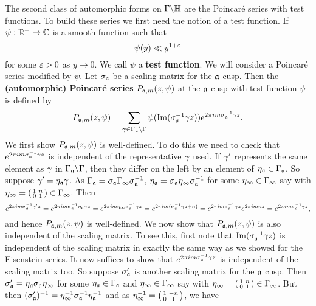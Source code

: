       The second class of automorphic forms on $\Gamma\backslash\mathbb{H}$ are the Poincar\'e series with test functions. To build these series we first need the notion of a test function. If $\psi:\mathbb{R}^{+} \to \mathbb{C}$ is a smooth function such that
      \[
        \psi(y) \ll y^{1+\varepsilon}
      \]
      for some $\varepsilon > 0$ as $y \to 0$. We call $\psi$ a \textbf{test function}. We will consider a Poincar\'e series modified by $\psi$. Let $\sigma_{\mathfrak{a}}$ be a scaling matrix for the $\mathfrak{a}$ cusp. Then the \textbf{(automorphic) Poincar\'e series} $P_{\mathfrak{a},m}(z,\psi)$ at the $\mathfrak{a}$ cusp with test function $\psi$ is defined by
      \[
        P_{\mathfrak{a},m}(z,\psi) = \sum_{\gamma \in \Gamma_{\mathfrak{a}}\backslash\Gamma}\psi(\mathrm{Im}(\sigma_{\mathfrak{a}}^{-1}\gamma z))e^{2\pi im\sigma_{\mathfrak{a}}^{-1}\gamma z}.
      \]
      We first show $P_{\mathfrak{a},m}(z,\psi)$ is well-defined. To do this we need to check that $e^{2\pi im\sigma_{\mathfrak{a}}^{-1}\gamma z}$ is independent of the representative $\gamma$ used. If $\gamma'$ represents the same element as $\gamma$ in $\Gamma_{\mathfrak{a}}\backslash\Gamma$, then they differ on the left by an element of $\eta_{\mathfrak{a}} \in \Gamma_{\mathfrak{a}}$. So suppose $\gamma' = \eta_{\mathfrak{a}}\gamma$. As $\Gamma_{\mathfrak{a}} = \sigma_{\mathfrak{a}}\Gamma_{\infty}\sigma_{\mathfrak{a}}^{-1}$, $\eta_{\mathfrak{a}} = \sigma_{\mathfrak{a}}\eta_{\infty}\sigma_{\mathfrak{a}}^{-1}$ for some $\eta_{\infty} \in \Gamma_{\infty}$ say with $\eta_{\infty} = \begin{psmallmatrix} 1 & n \\ 0 & 1 \end{psmallmatrix} \in \Gamma_{\infty}$. Then
      \[
        e^{2\pi im\sigma_{\mathfrak{a}}^{-1}\gamma' z} = e^{2\pi im\sigma_{\mathfrak{a}}^{-1}\eta_{\mathfrak{a}}\gamma z} = e^{2\pi im\eta_{\infty}\sigma_{\mathfrak{a}}^{-1}\gamma z} = e^{2\pi im(\sigma_{\mathfrak{a}}^{-1}\gamma z+n)} = e^{2\pi im\sigma_{\mathfrak{a}}^{-1}\gamma z}e^{2\pi imnz} = e^{2\pi im\sigma_{\mathfrak{a}}^{-1}\gamma z},
      \]
      and hence $P_{\mathfrak{a},m}(z,\psi)$ is well-defined. We now show that $P_{\mathfrak{a},m}(z,\psi)$ is also independent of the scaling matrix. To see this, first note that $\mathrm{Im}(\sigma_{\mathfrak{a}}^{-1}\gamma z)$ is independent of the scaling matrix in exactly the same way as we showed for the Eisenstein series. It now suffices to show that $e^{2\pi im\sigma_{\mathfrak{a}}^{-1}\gamma z}$ is independent of the scaling matrix too. So suppose $\sigma_{\mathfrak{a}}'$ is another scaling matrix for the $\mathfrak{a}$ cusp. Then $\sigma_{\mathfrak{a}}' = \eta_{\mathfrak{a}}\sigma_{\mathfrak{a}}\eta_{\infty}$ for some $\eta_{\mathfrak{a}} \in \Gamma_{\mathfrak{a}}$ and $\eta_{\infty} \in \Gamma_{\infty}$ say with $\eta_{\infty} = \begin{psmallmatrix} 1 & n \\ 0 & 1 \end{psmallmatrix} \in \Gamma_{\infty}$. But then $(\sigma_{\mathfrak{a}}')^{-1} = \eta_{\infty}^{-1}\sigma_{\mathfrak{a}}^{-1}\eta_{\mathfrak{a}}^{-1}$ and as $\eta_{\infty}^{-1} = \begin{psmallmatrix} 1 & -n \\ 0 & 1 \end{psmallmatrix}$, we have
